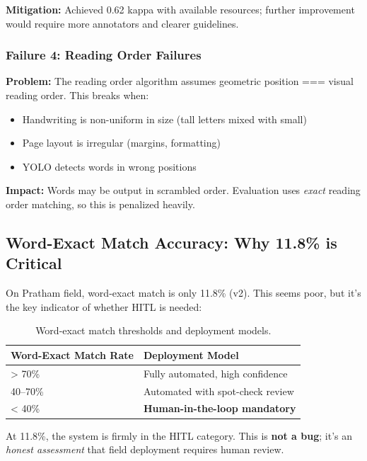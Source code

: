 \documentclass[14pt,a4paper]{article}
\begin{document}
\textbf{Mitigation:} Achieved 0.62 kappa with available resources; further improvement would require more annotators and clearer guidelines.

\subsubsection{Failure 4: Reading Order Failures}

\textbf{Problem:} The reading order algorithm assumes geometric position === visual reading order. This breaks when:
\begin{itemize}
    \item Handwriting is non-uniform in size (tall letters mixed with small)
    \item Page layout is irregular (margins, formatting)
    \item YOLO detects words in wrong positions
\end{itemize}

\textbf{Impact:} Words may be output in scrambled order. Evaluation uses \textit{exact} reading order matching, so this is penalized heavily.

\subsection{Word-Exact Match Accuracy: Why 11.8\% is Critical}

On Pratham field, word-exact match is only 11.8\% (v2). This seems poor, but it's the key indicator of whether HITL is needed:

\begin{table}[h]
    \centering
    \begin{tabular}{ll}
        \toprule
        \textbf{Word-Exact Match Rate} & \textbf{Deployment Model} \\
        \midrule
        > 70\% & Fully automated, high confidence \\
        40--70\% & Automated with spot-check review \\
        < 40\% & \textbf{Human-in-the-loop mandatory} \\
        \bottomrule
    \end{tabular}
    \caption{Word-exact match thresholds and deployment models.}
\end{table}

At 11.8\%, the system is firmly in the HITL category. This is \textbf{not a bug}; it's an \textit{honest assessment} that field deployment requires human review.
\end{document}
